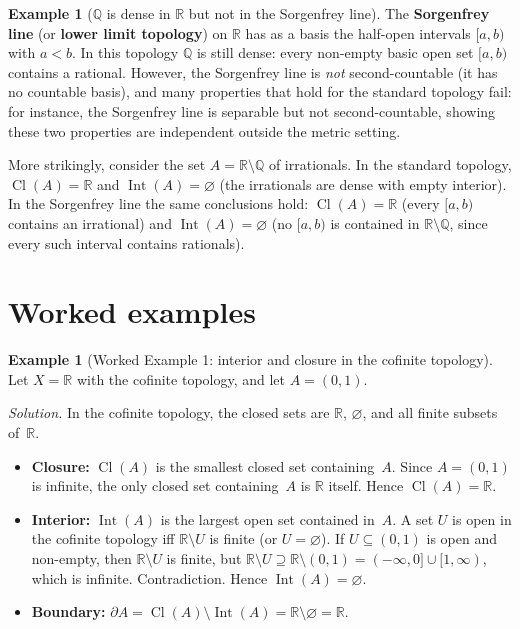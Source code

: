 \documentclass[11pt,a4paper,twoside]{book}
\theoremstyle{remark}
\theoremstyle{definition}
\newtheorem{exampleplain}[theorem]{Example}
\theoremstyle{definition}
\newcommand{\boundary}{\partial}         %
\newcommand{\R}{\mathbb{R}}
\newcommand{\Q}{\mathbb{Q}}
\DeclareMathOperator{\Int}{Int}
\DeclareMathOperator{\Cl}{Cl}
\begin{document}
\begin{exampleplain}[$\Q$ is dense in $\R$ but not in the Sorgenfrey line]
\label{ex:sorgenfrey-density}
The \textbf{Sorgenfrey line} (or \textbf{lower limit topology}) on $\R$ has
as a basis the half-open intervals $[a,b)$ with $a<b$.  In this topology
$\Q$ is still dense: every non-empty basic open set $[a,b)$ contains a
rational.  However, the Sorgenfrey line is \emph{not} second-countable (it has
no countable basis), and many properties that hold for the standard topology
fail: for instance, the Sorgenfrey line is separable but not second-countable,
showing these two properties are independent outside the metric setting.

More strikingly, consider the set $A=\R\setminus\Q$ of irrationals.  In the
standard topology, $\Cl(A)=\R$ and $\Int(A)=\varnothing$ (the irrationals are
dense with empty interior).  In the Sorgenfrey line the same conclusions hold:
$\Cl(A)=\R$ (every $[a,b)$ contains an irrational) and $\Int(A)=\varnothing$
(no $[a,b)$ is contained in $\R\setminus\Q$, since every such interval
contains rationals).
\end{exampleplain}


\section{Worked examples}
\label{sec:worked-examples-ch2}

\begin{exampleplain}[Worked Example 1: interior and closure in the cofinite topology]
\label{ex:ch2-worked1}
Let $X=\R$ with the cofinite topology, and let $A=(0,1)$.

\emph{Solution.}
In the cofinite topology, the closed sets are $\R$, $\varnothing$, and all
finite subsets of~$\R$.

\begin{itemize}
  \item \textbf{Closure:} $\Cl(A)$ is the smallest closed set containing~$A$.
        Since $A=(0,1)$ is infinite, the only closed set containing~$A$ is
        $\R$ itself.  Hence $\Cl(A)=\R$.
  \item \textbf{Interior:} $\Int(A)$ is the largest open set contained in~$A$.
        A set $U$ is open in the cofinite topology iff $\R\setminus U$ is
        finite (or $U=\varnothing$).  If $U\subseteq(0,1)$ is open and
        non-empty, then $\R\setminus U$ is finite, but
        $\R\setminus U\supseteq\R\setminus(0,1)=(-\infty,0]\cup[1,\infty)$,
        which is infinite.  Contradiction.  Hence $\Int(A)=\varnothing$.
  \item \textbf{Boundary:} $\boundary A=\Cl(A)\setminus\Int(A)=\R\setminus
        \varnothing=\R$.
\end{itemize}
\end{exampleplain}
\end{document}
